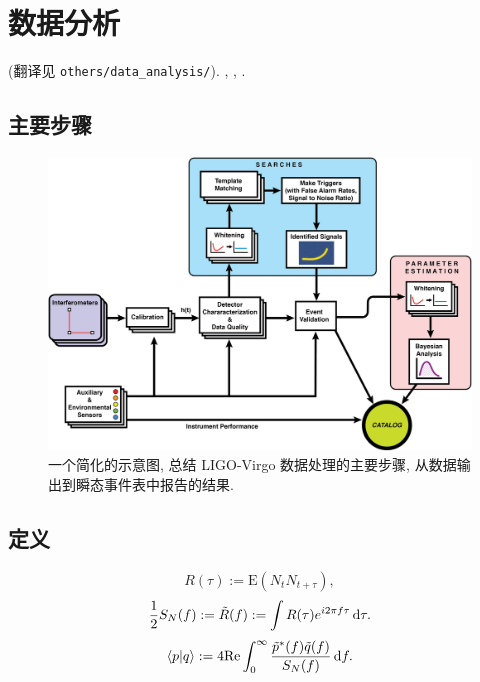 \chapter{数据分析}

\def\la{\langle}
\def\ra{\rangle}
\cite{Abbott2020} (翻译见 \texttt{others/data\_{}analysis/}). \cite{Maggiore2014}, \cite{Jaranowski2012,Jaranowski2009}, \cite{Finn1992}.

\section{主要步骤}

\begin{figure}[htbp]
    \centering
    \includegraphics[width=\textwidth]{image/data_processing_main_steps.jpg}
    \caption{
        一个简化的示意图, 总结 LIGO-Virgo 数据处理的主要步骤, 从数据输出到瞬态事件表中报告的结果. 
    }
\end{figure}

\section{定义}

\begin{equation}
    R(\tau):=\text{E}(N_tN_{t+\tau}),
\end{equation}
\begin{equation}
    \frac{1}{2}S_{N}(f):=\tilde{R}(f):=\int R(\tau)e^{i2\pi f\tau}\,\mathrm{d}\tau.
\end{equation}
\begin{equation}
    \la p|q \ra:=4\text{Re}\int_0^\infty\frac{\tilde{p}^*(f)\tilde{q}(f)}{S_{N}(f)}\,\d f.
\end{equation}

